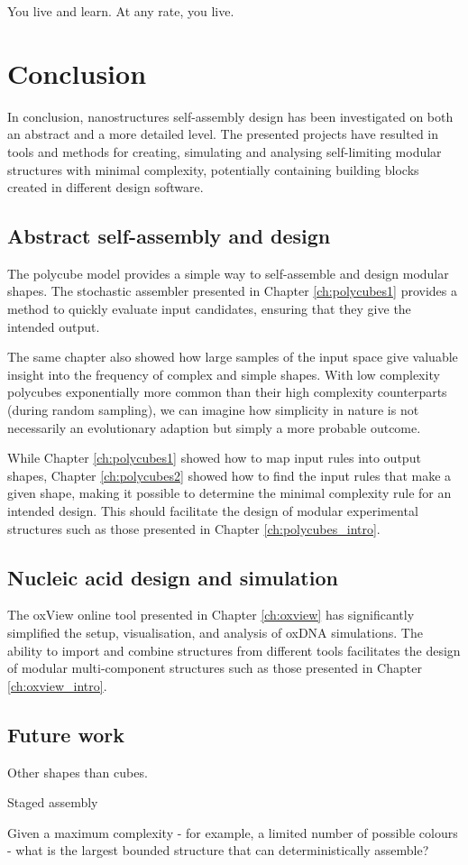 \begin{savequote}[8cm]
You live and learn. At any rate, you live.
\end{savequote}

\chapter{Conclusion}

In conclusion, nanostructures self-assembly design has been investigated on both an abstract and a more detailed level. The presented projects have resulted in tools and methods for creating, simulating and analysing self-limiting modular structures with minimal complexity, potentially containing building blocks created in different design software.


\section{Abstract self-assembly and design}

The polycube model provides a simple way to self-assemble and design modular shapes. The stochastic assembler presented in Chapter \ref{ch:polycubes1} provides a method to quickly evaluate input candidates, ensuring that they give the intended output.

The same chapter also showed how large samples of the input space give valuable insight into the frequency of complex and simple shapes. With low complexity polycubes exponentially more common than their high complexity counterparts (during random sampling), we can imagine how simplicity in nature is not necessarily an evolutionary adaption but simply a more probable outcome.

While Chapter \ref{ch:polycubes1} showed how to map input rules into output shapes, Chapter \ref{ch:polycubes2} showed how to find the input rules that make a given shape, making it possible to determine the minimal complexity rule for an intended design. This should facilitate the design of modular experimental structures such as those presented in Chapter \ref{ch:polycubes_intro}.

\section{Nucleic acid design and simulation}

The oxView online tool presented in Chapter \ref{ch:oxview} has significantly simplified the setup, visualisation, and analysis of oxDNA simulations. The ability to import and combine structures from different tools facilitates the design of modular multi-component structures such as those presented in Chapter \ref{ch:oxview_intro}.

\section{Future work}

Other shapes than cubes.

Staged assembly

Given a maximum complexity - for example, a limited number of possible colours - what is the largest bounded structure that can deterministically assemble?